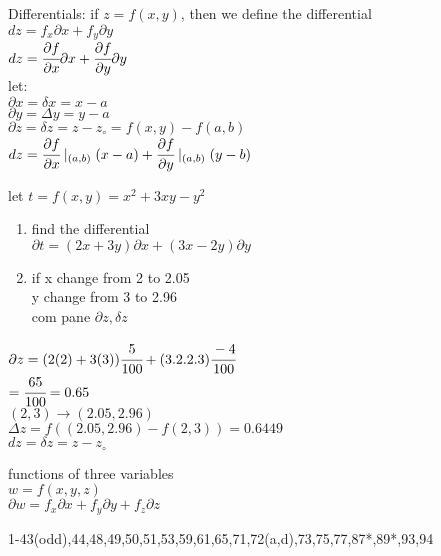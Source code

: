 \begin{definition}
Differentials: if $ z=f(x,y) $, then we define the differential \\
$dz=f_x \partial x + f_y \partial y $\\
$dz=\cfrac{\partial f}{\partial x} \partial x+\cfrac{\partial f} {\partial y }\partial y$\\
let:\\
$\partial x = \delta x = x-a $\\
$ \partial y = \Delta y = y-a $\\
$ \partial z =\delta z = z - z_\circ = f(x,y) - f(a,b)$\\
$ dz = \cfrac{\partial f} {\partial x}\mid_{(a,b)} (x-a) + \cfrac{\partial f}{\partial y}\mid_{(a,b)}(y-b)$
\end{definition}
\noindent{\color{smalt(darkpowderblue)}\rule{\linewidth}{.2mm}}
\begin{example}
let $t=f(x,y)=x^{2}+3xy-y^{2}$
\begin{enumerate}
    \item find the differential\\
    $\partial t = (2x + 3y) \partial x + (3x - 2y) \partial y$\\
    \item if x change from 2 to 2.05\\
    y change from 3 to 2.96 \\
    com pane $\partial z , \delta z$
\end{enumerate}
$\partial z = (2(2) + 3(3)) \cfrac{5}{100} + (3.2.2.3)\cfrac{-4}{100}$\\
$=\cfrac{65}{100} = 0.65 $\\
$(2,3)\rightarrow (2.05,2.96)$\\
$\Delta z = f((2.05,2.96)-f(2,3)) = 0.6449 $\\
$dz = \delta z = z - z_\circ$\\
\end{example}
\noindent{\color{smalt(darkpowderblue)}\rule{\linewidth}{.2mm}}
functions of three variables\\
$w = f (x,y,z) $\\
$\partial w = f_x \partial x + f_y \partial y + f_z \partial z $\\
\noindent{\color{smalt(darkpowderblue)}\rule{\linewidth}{.2mm}}
\begin{problem}
1-43(odd),44,48,49,50,51,53,59,61,65,71,72(a,d),73,75,77,87*,89*,93,94
\end{problem}
